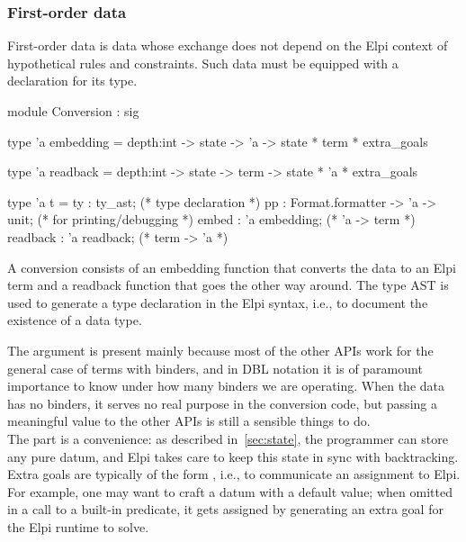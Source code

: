 \documentclass{these-ISSS}
\newenvironment{ocamlcode}
  {\VerbatimEnvironment\begin{ocamlbox}\begin{xocamlcode}}{\end{xocamlcode}
\end{ocamlbox}}
\begin{document}


  

\subsubsection{First-order data}\label{sec:fodata}\label{sec:opaquedata}

First-order data is data whose exchange does not depend on the Elpi context of
hypothetical rules and constraints. Such data must be equipped with a
 declaration for its type.

\begin{ocamlcode}
module Conversion : sig

type 'a embedding =
  depth:int ->
  state -> 'a -> state * term * extra_goals

type 'a readback =
  depth:int ->
  state -> term -> state * 'a * extra_goals

type 'a t = {
  ty : ty_ast;                         (* type declaration *)
  pp : Format.formatter -> 'a -> unit; (* for printing/debugging *)
  embed : 'a embedding;                (* 'a -> term *)
  readback : 'a readback;              (* term -> 'a *)
}
\end{ocamlcode}

\noindent
A conversion consists of an embedding function that converts the data to an
Elpi term and a readback function that goes the other way around. The type AST
 is used to generate a type declaration in the Elpi syntax, i.e.,
to document the existence of a data type.


The  argument is present mainly because most of the other APIs
work for the general case of terms with binders, and in DBL notation it is of
paramount importance to know under how many binders we are operating. When the
data has no binders, it serves no real purpose in the conversion code, but
passing a meaningful value to the other APIs is still a sensible things to do.\\
The  part is a convenience: as described in~\cref{sec:state},
the programmer can store any pure datum, and Elpi takes care to keep this
state in sync with backtracking.\\
Extra goals are typically of the form , i.e., to communicate an
assignment to Elpi. For example, one may want to craft a datum with a default
value; when omitted in a call to a built-in predicate, it gets assigned by
generating an extra goal for the Elpi runtime to solve.
\end{document}

